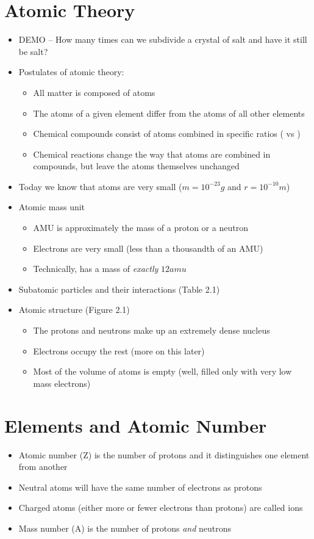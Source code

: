 \documentclass[12pt, openany, letterpaper]{memoir}
\begin{document}
\section{Atomic Theory}
\begin{itemize}
	\item DEMO -- How many times can we subdivide a crystal of salt and have it still be salt?
	\item Postulates of atomic theory:
	      \begin{itemize}
		      \item All matter is composed of atoms
		      \item The atoms of a given element differ from the atoms of all other elements
		      \item Chemical compounds consist of atoms combined in specific ratios ( vs )
		      \item Chemical reactions change the way that atoms are combined in compounds, but leave the atoms themselves unchanged
	      \end{itemize}
	\item Today we know that atoms are very small ($m=10^{-23}g$ and $r=10^{-10}m$)
	\item Atomic mass unit
	      \begin{itemize}
		      \item AMU is approximately the mass of a proton or a neutron
		      \item Electrons are very small (less than a thousandth of an AMU)
		      \item Technically,  has a mass of \emph{exactly} $12amu$
	      \end{itemize}
	\item Subatomic particles and their interactions (Table 2.1)
	\item Atomic structure (Figure 2.1)
	      \begin{itemize}
		      \item The protons and neutrons make up an extremely dense nucleus
		      \item Electrons occupy the rest (more on this later)
		      \item Most of the volume of atoms is empty (well, filled only with very low mass electrons)
	      \end{itemize}
\end{itemize}
\section{Elements and Atomic Number}
\begin{itemize}
	\item Atomic number (Z) is the number of protons and it distinguishes one element from another
	\item Neutral atoms will have the same number of electrons as protons
	\item Charged atoms (either more or fewer electrons than protons) are called ions
	\item Mass number (A) is the number of protons \emph{and} neutrons
\end{itemize}
\end{document}

